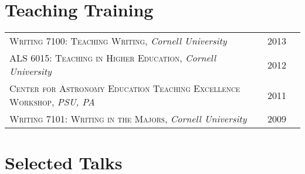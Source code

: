 \documentclass[10pt]{article} %
\begin{document}

\section{Teaching Training}

\begin{tabular}{l>{\hfill}p{2.1cm}r}
\textsc{Writing 7100:  Teaching Writing}, {\it Cornell University} & 2013 \\
\textsc{ALS 6015:  Teaching in Higher Education}, {\it Cornell University} & 2012\\
\textsc{Center for Astronomy Education Teaching Excellence Workshop}, {\it PSU, PA} & 2011 \\
\textsc{Writing 7101: Writing in the Majors}, {\it Cornell University} & 2009 \\
\end{tabular}


\section{Selected Talks}
\end{document}
